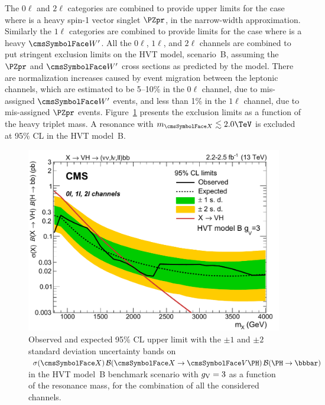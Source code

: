 The $0\ell$ and $2\ell$ categories are combined to provide upper limits for the case where \X is a heavy spin-1 vector singlet $\PZpr$, in 
the narrow-width approximation. Similarly the $1\ell$ categories are combined to provide limits for the case where \X is a heavy $\PW'$. 
All the $0\ell$, $1\ell$, and $2\ell$ channels are combined to put stringent exclusion limits on the HVT model, scenario~B, assuming the 
$\PZpr$ and $\PW'$ cross sections as predicted by the model. There are normalization increases caused by event migration between the 
leptonic channels, which are estimated to be 5--10\% in the $0\ell$ channel, due to mis-assigned $\PW'$ events, and less than 1\%  in the 
$1\ell$ channel, due to mis-assigned $\PZpr$ events. Figure~\ref{fig:xvh} presents the exclusion limits as a function of the heavy triplet 
mass. A resonance with $\mX \lesssim 2.0\TeV$ is excluded at 95\% CL in the HVT model~B.





\begin{figure}[!htb]\centering
    \includegraphics[width=\cmsFigWidth]{B2G-16-003/Figure_004.pdf}
    \caption{Observed and expected 95\% CL upper limit with the ${\pm}1$ and ${\pm}2$ standard deviation uncertainty bands on 
$\sigma(\X) \, \B(\X\to\VH) \, \B(\htobb)$  in the HVT model~B benchmark scenario with $g_\text{V}=3$ as a function of the resonance mass, for 
the combination of all the considered channels.}
  \label{fig:xvh}
\end{figure}



